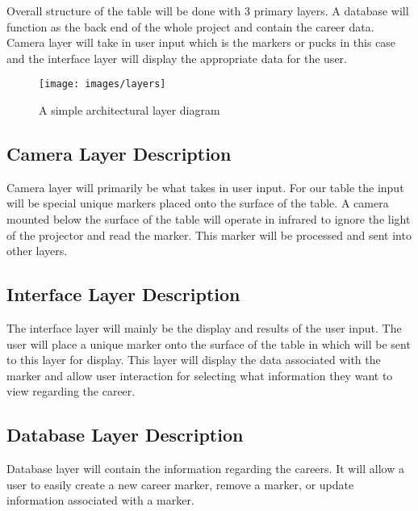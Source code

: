 Overall structure of the table will be done with 3 primary layers. A database will function as the back end of the whole project and contain the career data. Camera layer will take in user input which is the markers or pucks in this case and the interface layer will display the appropriate data for the user.  

\begin{figure}[h!]
	\centering
 	\texttt{[image: images/layers]}
 \caption{A simple architectural layer diagram}
\end{figure}

\subsection{Camera Layer Description}
Camera layer will primarily be what takes in user input. For our table the input will be special unique markers placed onto the surface of the table. A camera mounted below the surface of the table will operate in infrared to ignore the light of the projector and read the marker. This marker will be processed and sent into other layers.

\subsection{Interface Layer Description}
The interface layer will mainly be the display and results of the user input. The user will place a unique marker onto the surface of the table in which will be sent to this layer for display. This layer will display the data associated with the marker and allow user interaction for selecting what information they want to view regarding the career. 

\subsection{Database Layer Description}
Database layer will contain the information regarding the careers. It will allow a user to easily create a new career marker, remove a marker, or update information associated with a marker.  
